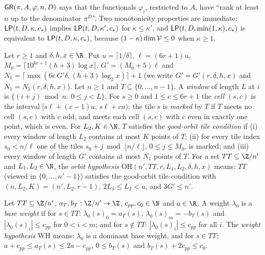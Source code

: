 $\mathsf{GR}(\pi,A,\varphi,n,D)$ says that the functionals $\varphi_i$, restricted to $A$, have ``rank at least $n$ up
to the denominator $\pi^D$''. Two monotonicity properties are immediate: $\mathsf{LP}(t,D,\kappa,c_*)$ implies
$\mathsf{LP}(t,D,\kappa',c_*)$ for $\kappa\le\kappa'$, and $\mathsf{LP}(t,D,\min(1,\kappa),c_*)$ is equivalent to
$\mathsf{LP}(t,D,\kappa,c_*)$, because $(1-\kappa)\dim\mathcal V\le0$ when $\kappa\ge1$.

\begin{definition}\label{pf:linkG:orbitpar}
Let $r\ge1$ and $\delta,h,x\in\R$. Put $u=\lceil1/\delta\rceil$, $\ell=(6r+1)u$,
$M_0=\lceil10^{6r+1}(h+3)\log x\rceil$, $G'=(M_0+5)\ell$ and
$N_1=\lceil\max(6e\,G'\delta,(h+3)\log_2x)\rceil+1$ (we write $G'=G'(r,\delta,h,x)$ and $N_1=N_1(r,\delta,h,x)$).
Let $n\ge1$ and $T\subseteq\{0,\dots,n-1\}$. A \emph{window} of length $L$ at $i$ is
$\{(i+j)\bmod n:\ 0\le j<L\}$. For $s\ge0$ and $1\le c\le6r+1$ the \emph{cell} $(s,c)$ is the interval
$[s\ell+(c-1)u,\,s\ell+cu)$; the tile $s$ is \emph{marked} by $T$ if $T$ meets no cell $(s,c)$ with $c$ odd, and
meets each cell $(s,c)$ with $c$ even in exactly one point, which is even. For $L_2,K\in\N$, $T$ satisfies the
\emph{good-orbit tile condition} if (i) every window of length $L_2$ contains at most $K$ points of $T$; (ii) for
every tile index $s_0<n/\ell$ one of the tiles $s_0+j\bmod\lfloor n/\ell\rfloor$, $0\le j\le M_0$, is marked; and
(iii) every window of length $G'$ contains at most $N_1$ points of $T$. For a set $TT\subseteq\Z/n'$ and
$L_1,L_2\in\N$, the \emph{orbit hypothesis} $\mathrm{OH}(n',TT,r,L_1,L_2,\delta,h,x)$ means: $TT$ (viewed in
$\{0,\dots,n'-1\}$) satisfies the good-orbit tile condition with $(n,L_2,K)=(n',L_2,r-1)$, $2L_1\le L_2<u$, and
$3G'\le n'$.
\end{definition}

\begin{definition}\label{pf:linkG:weighthyp}
Let $TT\subseteq\Z/n'$, $a_T,b_T:\Z/n'\to\Z$, $c_{pp},c_0\in\N$ and $a\in\R$. A weight $\lambda_0$ is a
\emph{base weight} if for $s\in TT$: $\lambda_0(s)_0=a_T(s)$, $\lambda_0(s)_m=-b_T(s)$ and
$|\lambda_0(s)_i|\le c_{pp}$ for $0<i<m$; and for $s\notin TT$: $|\lambda_0(s)_i|\le c_{pp}$ for all $i$. The
\emph{weight hypothesis} $\mathrm{WH}$ means: $\lambda_0$ is a dominant base weight, and for $s\in TT$:
$a+c_{pp}\le a_T(s)\le2a-c_{pp}$, $0\le b_T(s)$ and $b_T(s)+2c_{pp}\le c_0$.
\end{definition}

